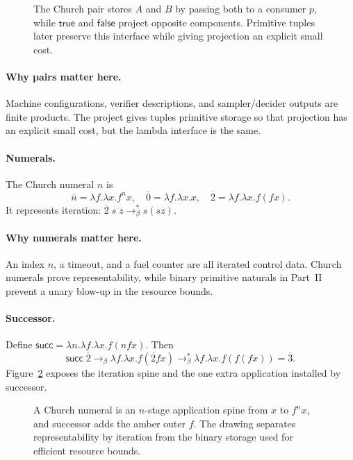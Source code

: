 \begin{figure}[ht]
\centering

\caption{The Church pair stores $A$ and $B$ by passing both to a consumer $p$, while $\mathsf{true}$ and $\mathsf{false}$ project opposite components.  Primitive tuples later preserve this interface while giving projection an explicit small cost.}
\label{fig:church-pair}
\end{figure}

\paragraph{Why pairs matter here.}
Machine configurations, verifier descriptions, and sampler/decider outputs
are finite products.  The project gives tuples primitive storage so that
projection has an explicit small cost, but the lambda interface is the same.

\paragraph{Numerals.}
The Church numeral \(n\) is
\[
 \overline n=\lambda f.\lambda x.f^n x,
 \quad
 \overline0=\lambda f.\lambda x.x,
 \quad
 \overline2=\lambda f.\lambda x.f(fx).
\]
It represents iteration: \(\overline2\;s\;z\to_\beta^*s(sz)\).

\paragraph{Why numerals matter here.}
An index \(n\), a timeout, and a fuel counter are all iterated control data.
Church numerals prove representability, while binary primitive naturals in
Part~II prevent a unary blow-up in the resource bounds.

\paragraph{Successor.}
Define
\(\mathsf{succ}=\lambda n.\lambda f.\lambda x.f(nfx)\).  Then
\[
 \mathsf{succ}\;\overline2
 \to_\beta\lambda f.\lambda x.f(\overline2 f x)
 \to_\beta^*\lambda f.\lambda x.f(f(fx))=\overline3.
\]
Figure~\ref{fig:church-numeral} exposes the iteration spine and the one extra
application installed by successor.

\begin{figure}[ht]
\centering

\caption{A Church numeral is an $n$-stage application spine from $x$ to $f^n x$, and successor adds the amber outer $f$.  The drawing separates representability by iteration from the binary storage used for efficient resource bounds.}
\label{fig:church-numeral}
\end{figure}

